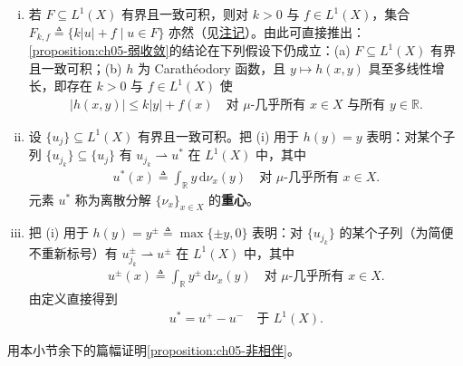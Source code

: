 \documentclass[../../main.tex]{subfiles}
\begin{document}
\begin{remark}\label{remark:ch05-一致可积加强}
\begin{enumerate}[(i)]
\item 若 $F\subseteq L^1(X)$ 有界且一致可积，则对 $k>0$ 与 $f\in L^1(X)$，集合 $F_{k,f}\triangleq\{k|u|+f\mid u\in F\}$ 亦然（见\hyperref[remark:ch02-正负一致可积]{注记}）。由此可直接推出：\cref{proposition:ch05-弱收敛}的结论在下列假设下仍成立：(a) $F\subseteq L^1(X)$ 有界且一致可积；(b) $h$ 为 Carathéodory 函数，且 $y\mapsto h(x,y)$ 具至多线性增长，即存在 $k>0$ 与 $f\in L^1(X)$ 使
\begin{align*}
|h(x,y)|\leqslant k|y|+f(x)
\quad\text{对 }\mu\text{-几乎所有 }x\in X\text{ 与所有 }y\in\mathbb{R}.
\end{align*}

\item 设 $\{u_j\}\subseteq L^1(X)$ 有界且一致可积。把 (i) 用于 $h(y)=y$ 表明：对某个子列 $\{u_{j_k}\}\subseteq\{u_j\}$ 有 $u_{j_k}\rightharpoonup u^*$ 在 $L^1(X)$ 中，其中
\begin{align}
u^*(x)\triangleq\int_{\mathbb{R}}y\,\mathrm{d}\nu_x(y)
\quad\text{对 }\mu\text{-几乎所有 }x\in X.\label{align:ch05-5.85}
\end{align}
元素 $u^*$ 称为离散分解 $\{\nu_x\}_{x\in X}$ 的\textbf{重心}。

\item 把 (i) 用于 $h(y)=y^\pm\triangleq\max\{\pm y,0\}$ 表明：对 $\{u_{j_k}\}$ 的某个子列（为简便不重新标号）有 $u^\pm_{j_k}\rightharpoonup u^\pm$ 在 $L^1(X)$ 中，其中
\begin{align}
u^\pm(x)\triangleq\int_{\mathbb{R}}y^\pm\,\mathrm{d}\nu_x(y)
\quad\text{对 }\mu\text{-几乎所有 }x\in X.\label{align:ch05-5.86}
\end{align}
由定义直接得到
\begin{align}
u^*=u^+-u^-\quad\text{于 }L^1(X).\label{align:ch05-5.87}
\end{align}
\end{enumerate}
\end{remark}

用本小节余下的篇幅证明\cref{proposition:ch05-非相伴}。
\end{document}
